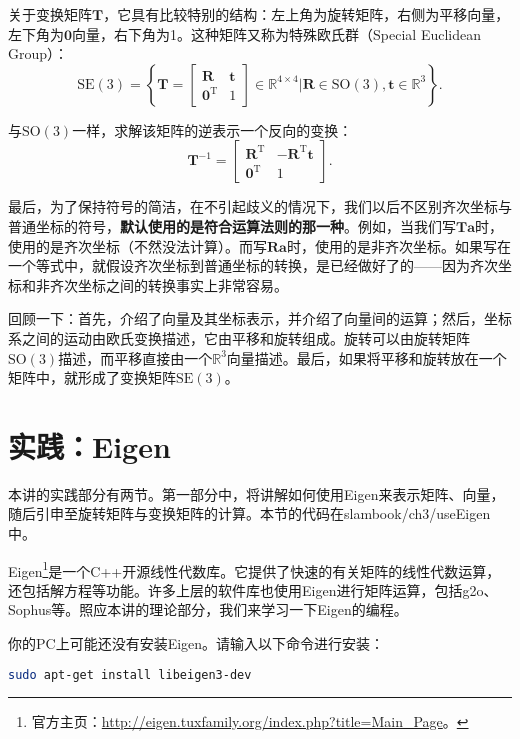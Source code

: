 关于变换矩阵$\bm{T}$，它具有比较特别的结构：左上角为旋转矩阵，右侧为平移向量，左下角为$\bm{0}$向量，右下角为1。这种矩阵又称为特殊欧氏群（Special Euclidean Group）：
\begin{equation}
\mathrm{SE}(3) = \left\{ \bm{T} = \left[ {\begin{array}{*{20}{c}}
	\bm{R} & \bm{t} \\
	{{\bm{0}^\mathrm{T}}} & 1
	\end{array}} \right]
\in \mathbb{R}^{4 \times 4} | \bm{R} \in \mathrm{SO}(3), \bm{t} \in \mathbb{R}^3\right\} .
\end{equation}

与$\mathrm{SO}(3)$一样，求解该矩阵的逆表示一个反向的变换：
\begin{equation}
{ \bm{T}^{ - 1}} = \left[ {\begin{array}{*{20}{c}}
	{{\bm{R}^\mathrm{T}}}&{ - {\bm{R}^\mathrm{T}}\bm{t}}\\
	{{\bm{0}^\mathrm{T}}}&1
	\end{array}} \right].
\end{equation}

最后，为了保持符号的简洁，在不引起歧义的情况下，我们以后不区别齐次坐标与普通坐标的符号，\textbf{默认使用的是符合运算法则的那一种}。例如，当我们写$\bm{T} \bm{a}$时，使用的是齐次坐标（不然没法计算）。而写$\bm{Ra}$时，使用的是非齐次坐标。如果写在一个等式中，就假设齐次坐标到普通坐标的转换，是已经做好了的——因为齐次坐标和非齐次坐标之间的转换事实上非常容易。

回顾一下：首先，介绍了向量及其坐标表示，并介绍了向量间的运算；然后，坐标系之间的运动由欧氏变换描述，它由平移和旋转组成。旋转可以由旋转矩阵$\mathrm{SO}(3)$描述，而平移直接由一个$\mathbb{R}^3$向量描述。最后，如果将平移和旋转放在一个矩阵中，就形成了变换矩阵$\mathrm{SE}(3)$。

\section{实践：Eigen}
本讲的实践部分有两节。第一部分中，将讲解如何使用Eigen来表示矩阵、向量，随后引申至旋转矩阵与变换矩阵的计算。本节的代码在slambook/ch3/useEigen中。

Eigen\footnote{官方主页：\url{http://eigen.tuxfamily.org/index.php?title=Main_Page}。}是一个C++开源线性代数库。它提供了快速的有关矩阵的线性代数运算，还包括解方程等功能。许多上层的软件库也使用Eigen进行矩阵运算，包括g2o、Sophus等。照应本讲的理论部分，我们来学习一下Eigen的编程。

你的PC上可能还没有安装Eigen。请输入以下命令进行安装：
\begin{lstlisting}[language=sh]
sudo apt-get install libeigen3-dev
\end{lstlisting}

